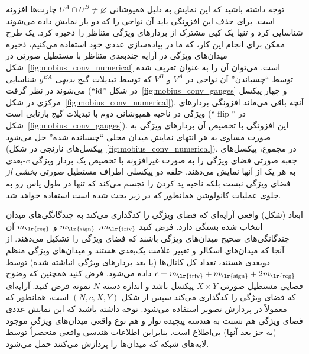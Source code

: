 توجه داشته باشید که این نمایش به دلیل همپوشانی $U^A \cap U^B \neq \varnothing$ چارت‌ها افزونه است.
برای حذف این افزونگی باید آن نواحی را که دو بار نمایش داده می‌شوند شناسایی کرد و تنها یک کپی مشترک از بردارهای ویژگی متناظر را ذخیره کرد.
یک طرح ممکن برای انجام این کار، که ما در پیاده‌سازی عددی خود استفاده می‌کنیم، ذخیره میدان‌های ویژگی در آرایه چندبعدی متناظر با مستطیل صورتی در شکل~\ref{fig:mobius_conv_numerical} است.
می‌توان آن را به عنوان تعریف شده توسط ``چسباندن'' آن نواحی در $V^A$ و $V^B$ که توسط تبدیلات گیج \emph{بدیهی} $g^{BA}$ شناسایی می‌شوند در نظر گرفت (``$\mathrm{id}$'' در شکل~\ref{fig:mobius_conv_gauges} و چهار پیکسل مرکزی در شکل~\ref{fig:mobius_conv_numerical}).
آنچه باقی می‌ماند افزونگی بردارهای ویژگی در ناحیه همپوشانی دوم با تبدیلات گیج بازتابی است (``$\operatorname{flip}$'' در شکل~\ref{fig:mobius_conv_gauges}).
این افزونگی با تخصیص آن بردارهای ویژگی به صورت مساوی به هر انتهای نمایش میدان محلی ``چسبانده شده'' حل می‌شود (پیکسل‌های نارنجی در شکل~\ref{fig:mobius_conv_numerical}).
در مجموع، پیکسل‌های جعبه صورتی فضای ویژگی را به صورت غیرافزونه با تخصیص یک بردار ویژگی $c$-بعدی به هر یک از آنها نمایش می‌دهند.
حلقه دو پیکسلی اطراف مستطیل صورتی \emph{بخشی از} فضای ویژگی نیست بلکه ناحیه پد کردن را تجسم می‌کند که تنها در طول پاس رو به جلوی عملیات کانولوشن همانطور که در زیر بحث شده است استفاده خواهد شد.

ابعاد (شکل) واقعی آرایه‌ای که فضای ویژگی را کدگذاری می‌کند به چندگانگی‌های میدان انتخاب شده بستگی دارد.
فرض کنید $m_{\textup{\lr{triv}}}$، $m_{\textup{\lr{sign}}}$ و $m_{\textup{\lr{reg}}}$ آن چندگانگی‌های صحیح میدان‌های ویژگی باشند که فضای ویژگی را تشکیل می‌دهند.
از آنجا که میدان‌های اسکالر و تغییر علامت یک‌بعدی هستند و میدان‌های ویژگی منظم دوبعدی هستند، تعداد کل کانال‌ها (یا بعد بردارهای ویژگی انباشته شده) توسط $c = m_{\textup{\lr{triv}}} + m_{\textup{\lr{sign}}} + 2 m_{\textup{\lr{reg}}}$ داده می‌شود.
فرض کنید همچنین که وضوح فضایی مستطیل صورتی $X\times Y$ پیکسل باشد و اندازه دسته $N$ نمونه فرض کنید.
آرایه‌ای که فضای ویژگی را کدگذاری می‌کند سپس از شکل $(N,c,X,Y)$ است، همانطور که معمولاً در پردازش تصویر استفاده می‌شود.
توجه داشته باشید که این نمایش عددی فضای ویژگی هم نسبت به هندسه پیچیده نوار و هم نوع واقعی میدان‌های ویژگی موجود (به جز بعد آنها) بی‌اطلاع است.
بنابراین اطلاعات هندسی واقعی منحصراً توسط لایه‌های شبکه که میدان‌ها را پردازش می‌کنند حمل می‌شود.



